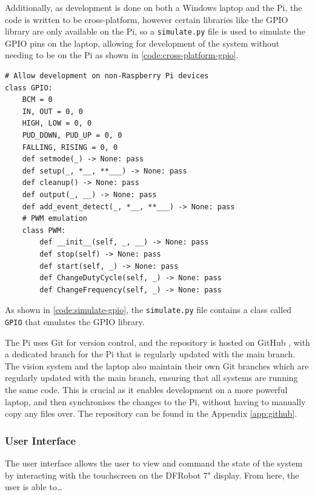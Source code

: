 Additionally, as development is done on both a Windows laptop and the Pi, the code is written to be cross-platform, however certain libraries like the GPIO library are only available on the Pi, so a \texttt{simulate.py} file is used to simulate the GPIO pins on the laptop, allowing for development of the system without needing to be on the Pi as shown in \autoref{code:cross-platform-gpio}.

\begin{minipage}[H]{\textwidth}
    \centering
    \begin{verbatim}
# Allow development on non-Raspberry Pi devices
class GPIO:
    BCM = 0
    IN, OUT = 0, 0
    HIGH, LOW = 0, 0
    PUD_DOWN, PUD_UP = 0, 0
    FALLING, RISING = 0, 0
    def setmode(_) -> None: pass
    def setup(_, *__, **___) -> None: pass
    def cleanup() -> None: pass
    def output(_, __) -> None: pass
    def add_event_detect(_, *__, **___) -> None: pass
    # PWM emulation
    class PWM:
        def __init__(self, _, __) -> None: pass
        def stop(self) -> None: pass
        def start(self, _) -> None: pass
        def ChangeDutyCycle(self, _) -> None: pass
        def ChangeFrequency(self, _) -> None: pass
    \end{verbatim}
    \label{code:simulate-gpio}
\end{minipage}

As shown in \autoref{code:simulate-gpio}, the \texttt{simulate.py} file contains a class called \texttt{GPIO} that emulates the GPIO library.

The Pi uses Git \cite{git} for version control, and the repository is hosted on GitHub \cite{github}, with a dedicated branch for the Pi that is regularly updated with the main branch. The vision system and the laptop also maintain their own Git branches which are regularly updated with the main branch, ensuring that all systems are running the same code. This is crucial as it enables development on a more powerful laptop, and then synchronises the changes to the Pi, without having to manually copy any files over. The repository can be found in the Appendix \ref{app:github}.
\subsubsection{User Interface}
The user interface allows the user to view and command the state of the system by interacting with the touchscreen on the DFRobot 7" display. From here, the user is able to\dots

